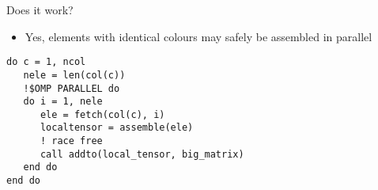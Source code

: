 \documentclass[bigger]{beamer}
\begin{document}
\begin{frame}[fragile,label={sec:orgheadline22}]{Does it work?}
 \begin{itemize}
\item Yes, elements with identical colours may safely be assembled in
parallel
\end{itemize}

\begin{verbatim}
do c = 1, ncol
   nele = len(col(c))
   !$OMP PARALLEL do
   do i = 1, nele
      ele = fetch(col(c), i)
      localtensor = assemble(ele)
      ! race free
      call addto(local_tensor, big_matrix)
   end do
end do
\end{verbatim}
\end{frame}
\end{document}
